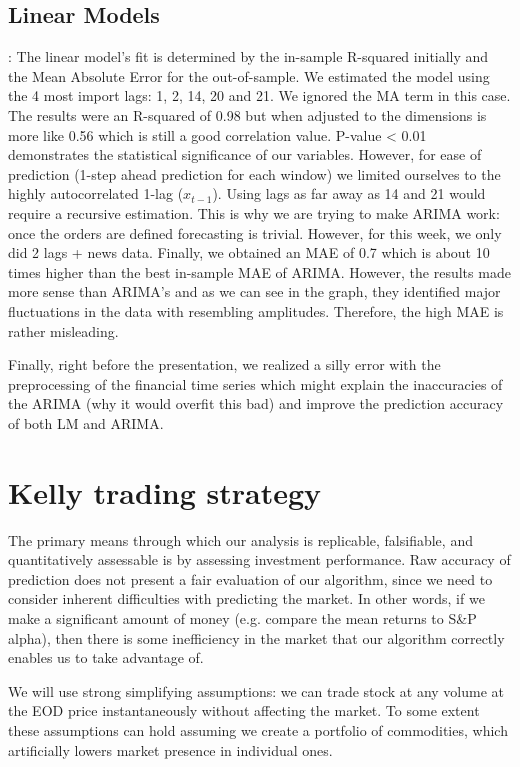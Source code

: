 \documentclass{article}
\begin{document}
	\subsection{Linear Models}:
	The linear model's fit is determined by the in-sample R-squared initially and the Mean Absolute Error for the out-of-sample.
	We estimated the model using the 4 most import lags: 1, 2, 14, 20 and 21. We ignored the MA term in this case.
	The results were an R-squared of 0.98 but when adjusted to the dimensions is more like 0.56 which is still a good correlation value. P-value < 0.01 demonstrates the statistical significance of our variables.
	However, for ease of prediction (1-step ahead prediction for each window) we limited ourselves to the highly autocorrelated 1-lag ($x_{t-1}$). Using lags as far away as 14 and 21 would require a recursive estimation. This is why we are trying to make ARIMA work: once the orders are defined forecasting is trivial. However, for this week, we only did 2 lags + news data.
	Finally, we obtained an MAE of 0.7 which is about 10 times higher than the best in-sample MAE of ARIMA. However, the results made more sense than ARIMA's and as we can see in the graph, they identified major fluctuations in the data with resembling amplitudes. Therefore, the high MAE is rather misleading.
	
	Finally, right before the presentation, we realized a silly error with the preprocessing of the financial time series which might explain the inaccuracies of the ARIMA (why it would overfit this bad) and improve the prediction accuracy of both LM and ARIMA.
	\section{Kelly trading strategy}
	
The primary means through which our analysis is replicable, falsifiable, and quantitatively assessable is by assessing investment performance. Raw accuracy of prediction does not present a fair evaluation of our algorithm, since we need to consider inherent difficulties with predicting the market. In other words, if we make a significant amount of money (e.g. compare the mean returns to S\&P alpha), then there is some inefficiency in the market that our algorithm correctly enables us to take advantage of.

We will use strong simplifying assumptions: we can trade stock at any volume at the EOD price instantaneously without affecting the market. To some extent these assumptions can hold assuming we create a portfolio of commodities, which artificially lowers market presence in individual ones.
\end{document}
